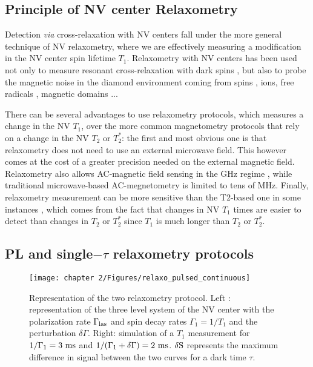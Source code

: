 \documentclass[a4paper,11pt]{report}
\begin{document}
\begin{refsection}
\subsection{Principle of NV center Relaxometry}
Detection \textit{via} cross-relaxation	with NV centers fall under the more general technique of NV relaxometry, where we are effectively measuring a modification in the NV center spin lifetime $T_1$. Relaxometry with NV centers has been used not only to measure resonant cross-relaxation with dark spins \citep{van1989cross, holliday1989optical, epstein2005anisotropic, armstrong2010nv,   hall2016detection, wickenbrock2016microwave,  wood2016wide,  alfasi2019detection, lazda2021cross}, but also to probe the magnetic noise in the diamond environment coming from spins \citep{steinert2013magnetic}, ions\citep{tetienne2013spin}, free radicals \citep{nie2021quantum}, magnetic domains \citep{finco2021imaging}...

There can be several advantages to use relaxometry protocols, which measures a change in the NV $T_1$, over the more common magnetometry protocols that rely on a change in the NV $T_2$ or $T_2^*$: the first and most obvious one is that relaxometry does not need to use an external microwave field. This however comes at the cost of a greater precision needed on the external magnetic field. Relaxometry also allows AC-magnetic field sensing in the GHz regime \citep{wang2022picotesla, alsid2022solid}, while traditional microwave-based AC-megnetometry is limited to tens of MHz. Finally, relaxometry measurement can be more sensitive than the T2-based one in some instances \citep{steinert2013magnetic}, which comes from the fact that changes in NV $T_1$ times are easier to detect than changes in $T_2$ or $T_2^*$ since $T_1$ is much longer than $T_2$ or $T_2^*$.

\subsection{PL and single$-\tau$ relaxometry protocols}
\begin{figure}[h]
\centering
\texttt{[image: chapter 2/Figures/relaxo\_pulsed\_continuous]}
\caption{Representation of the two relaxometry protocol. Left : representation of the three level system of the NV center with the polarization rate $\Gamma_{\rm las}$ and spin decay rates $\Gamma_1=1/T_1$ and the perturbation $\delta \Gamma$. Right: simulation of a $T_1$ measurement for $1/\Gamma_1=3\ \rm ms$ and $1/(\Gamma_1+\delta \Gamma)=2\ \rm ms$. $\delta \rm S$ represents the maximum difference in signal between the two curves for a dark time $\tau$.}
\label{T1 vs PL}
\end{figure}


\end{refsection}
\end{document}

